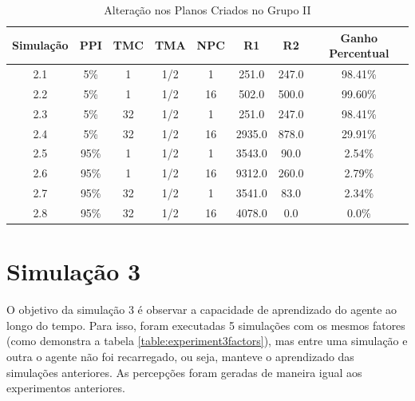 \begin{table}
    \begin{center}
        \caption{ Alteração nos Planos Criados no Grupo II }
        \label{table:plansaltv2}
        \begin{tabular}{ |c|c|c|c|c|c|c|c| }
            \hline
            \textbf{Simulação} & \textbf{PPI} & \textbf{TMC} & \textbf{TMA} & \textbf{NPC} & \textbf{R1} & \textbf{R2} & \textbf{Ganho Percentual}\\
            \hline
            2.1 & 5\% & 1 & 1/2 & 1 & 251.0 & 247.0 & 98.41\%\\
            \hline
            2.2 & 5\% & 1 & 1/2 & 16 & 502.0 & 500.0 & 99.60\%\\
            \hline
            2.3 & 5\% & 32 & 1/2 & 1 & 251.0 & 247.0 & 98.41\%\\
            \hline
            2.4 & 5\% & 32 & 1/2 & 16 & 2935.0 & 878.0 & 29.91\%\\
            \hline
            2.5 & 95\% & 1 & 1/2 & 1 & 3543.0 & 90.0 & 2.54\%\\
            \hline
            2.6 & 95\% & 1 & 1/2 & 16 & 9312.0 & 260.0 & 2.79\%\\
            \hline
            2.7 & 95\% & 32 & 1/2 & 1 & 3541.0 & 83.0 & 2.34\%\\
            \hline
            2.8 & 95\% & 32 & 1/2 & 16 & 4078.0 & 0.0 & 0.0\%\\
            \hline
            
        \end{tabular}{}
    \end{center}{}
\end{table}

\section{Simulação 3}

O objetivo da simulação 3 é observar a capacidade de aprendizado do agente ao longo do tempo. Para isso, foram executadas 5 simulações com os mesmos fatores (como demonstra a tabela \ref{table:experiment3factors}), mas entre uma simulação e outra o agente não foi recarregado, ou seja, manteve o aprendizado das simulações anteriores. As percepções foram geradas de maneira igual aos experimentos anteriores.

